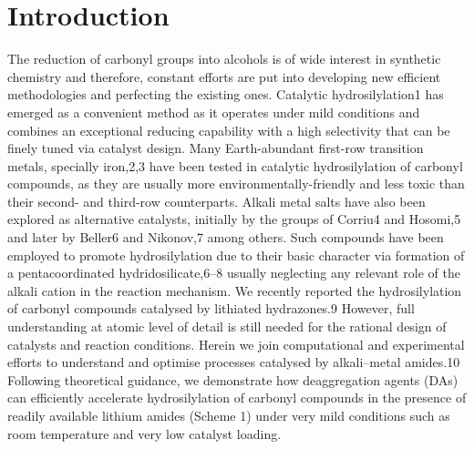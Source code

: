 \documentclass{article}
\begin{document}
	\section{Introduction}
	The reduction of carbonyl groups into alcohols is of wide interest in synthetic chemistry and therefore, constant efforts are	put into developing new efficient methodologies and perfecting
	the existing ones. Catalytic hydrosilylation1 has emerged as a convenient method as it operates under mild conditions and	combines an exceptional reducing capability with a high	selectivity that can be finely tuned via catalyst design. Many Earth-abundant first-row transition metals, specially iron,2,3
	have been tested in catalytic hydrosilylation of carbonyl compounds, as they are usually more environmentally-friendly and less toxic than their second- and third-row counterparts. Alkali
	metal salts have also been explored as alternative catalysts, initially by the groups of Corriu4 and Hosomi,5 and later by Beller6 and Nikonov,7 among others. Such compounds have been employed to promote hydrosilylation due to their basic character via formation of a pentacoordinated hydridosilicate,6–8 usually neglecting any relevant role of the alkali cation in the reaction mechanism. We recently reported	the hydrosilylation of carbonyl compounds catalysed by
	lithiated hydrazones.9 However, full understanding at atomic level of detail is still needed for the rational design of catalysts and reaction conditions.
	Herein we join computational and experimental efforts to understand and optimise processes catalysed by alkali–metal	amides.10 Following theoretical guidance, we demonstrate how deaggregation agents (DAs) can efficiently accelerate hydrosilylation of carbonyl compounds in the presence of readily available lithium amides (Scheme 1) under very mild conditions such as room temperature and very low catalyst loading.
		

	
\end{document}
